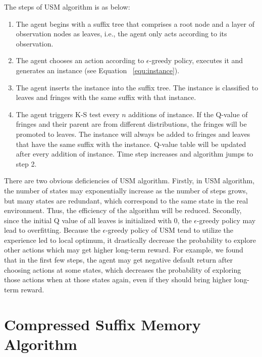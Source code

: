 \documentclass[conference]{IEEEtran}
\begin{document}
	The steps of USM algorithm is as below:
	
	\begin{enumerate}
		\item The agent begins with a suffix tree that comprises a root node and a layer of
		observation nodes as leaves, i.e., the agent only acts according to its observation.
		
		\item The agent chooses an action according to $\epsilon$-greedy policy, executes it and
		generates an instance (see Equation ~\ref{equ:instance}).
		
		\item The agent inserts the instance into the suffix tree. The instance is classified to
		leaves and fringes with the same suffix with that instance. 
		
		\item The agent triggers K-S test every $n$ additions of instance. If the Q-value of fringes
		and their parent are from different distributions, the fringes will be promoted to leaves.
		The instance will always be added to fringes and leaves that have the same suffix with the instance.
		Q-value table will be updated after every addition of instance. Time step increases and algorithm
		jumps to step 2.
	\end{enumerate}
	
	There are two obvious deficiencies of USM algorithm. Firstly, in USM algorithm,
	the number of states may exponentially increase as the number of steps grows, but many
	states are redundant, which correspond to the same state in the real environment. Thus,
	the efficiency of the algorithm will be reduced. Secondly, since the initial Q value of all leaves
	is initialized with 0, the $\epsilon$-greedy policy may lead to overfitting. Because
	the $\epsilon$-greedy policy of USM tend to utilize the experience led to local optimum, it drastically
	decrease the probability to explore other actions which may get higher long-term reward. For example,
	we found that in the first few steps, the agent may get negative default return after
	choosing actions at some states, which decreases the probability of exploring those actions
	when at those states again, even if they should bring higher long-term reward.
	
	\section{Compressed Suffix Memory Algorithm}
	
\end{document}
